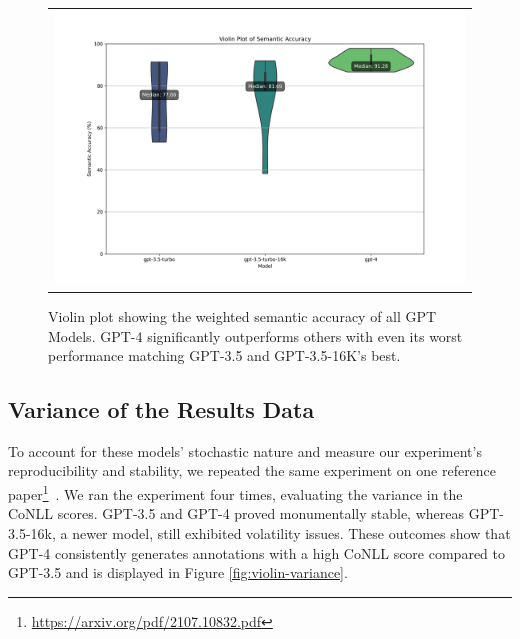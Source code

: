 \begin{figure}[ht]
  \centering
  \begin{tabular}{c}
  \includegraphics[width=14cm]{images/semantic-accuracy.png}
  \end{tabular}
  \caption[Semantic Accuracy]{Violin plot showing the weighted semantic accuracy of all GPT Models. GPT-4 significantly outperforms others with even its worst performance matching GPT-3.5 and GPT-3.5-16K's best.}\label{fig:violin-semantic}
\end{figure}

\subsection{Variance of the Results Data}

To account for these models' stochastic nature and measure our experiment's reproducibility and stability, we repeated the same experiment on one reference paper\footnote{\url{https://arxiv.org/pdf/2107.10832.pdf}}~\citep{singleton2021logic}. We ran the experiment four times, evaluating the variance in the CoNLL scores. GPT-3.5 and GPT-4 proved monumentally stable, whereas GPT-3.5-16k, a newer model, still exhibited volatility issues. These outcomes show that GPT-4 consistently generates annotations with a high CoNLL score compared to GPT-3.5 and is displayed in Figure \ref{fig:violin-variance}.

